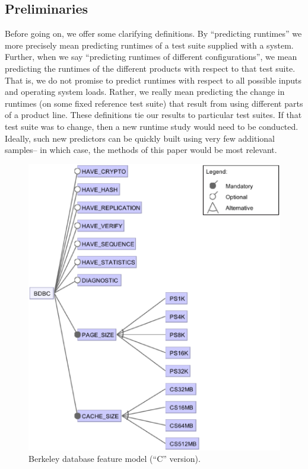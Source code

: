 \documentclass{sig-alternative}
\begin{document}
\subsection{Preliminaries}
Before going on, we offer   some clarifying definitions.
By   ``predicting runtimes'' we more precisely 
mean predicting
runtimes of a test suite supplied with a system. Further, when we say ``predicting runtimes
of different configurations'', we mean predicting the runtimes of the different products
with respect to that test suite.  That is, we do not promise to predict runtimes with respect
to all possible inputs and operating system loads. Rather, we really mean predicting
the change in runtimes (on some fixed reference test suite) that result from using different
parts of a product line. These definitions tie our results to particular test suites.
If that test suite was to change, then a  new
runtime study would need  to be conducted. Ideally, such new predictors
can be quickly built using very few additional samples-- in which case, the methods
of this paper would be most relevant.

 
\begin{figure}[!t]
\includegraphics[width=1\linewidth]{Figures/BDBC.eps}
\caption{ Berkeley database feature model   (``C'' version). }\label{fig:bdbc}
\end{figure}
    
\end{document}
